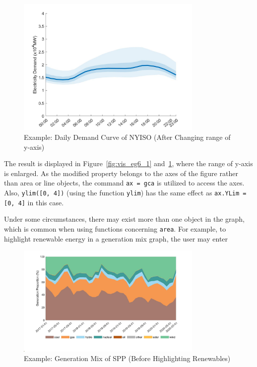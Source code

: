 \documentclass[11pt]{article}
\numberwithin{equation}{section}
\numberwithin{table}{section}
\numberwithin{figure}{section}
\begin{document}
\begin{figure}
  \centering
  \noindent\includegraphics[width=0.8\textwidth]{figures/visualization_example6_2.jpg}
  \caption{Example: Daily Demand Curve of NYISO (After Changing range of y-axis)} \label{fig:vis_eg6_2}
\end{figure}

The result is displayed in Figure~\ref{fig:vis_eg6_1} and~\ref{fig:vis_eg6_2}, where the range of y-axis is enlarged. As the modified property belongs to the axes of the figure rather than area or line objects, the command \verb!ax = gca! is utilized to access the axes. Also, \verb!ylim([0, 4])! (using the function \verb!ylim!) has the same effect as \verb!ax.YLim = [0, 4]! in this case.

Under some circumstances, there may exist more than one object in the graph, which is common when using functions concerning \verb!area!. For example, to highlight renewable energy in a generation mix graph, the user may enter


\begin{figure}
  \centering
  \noindent\includegraphics[width=0.8\textwidth]{figures/visualization_example7_1.jpg}
  \caption{Example: Generation Mix of SPP (Before Highlighting Renewables)} \label{fig:vis_eg7_1}
\end{figure}
\end{document}
